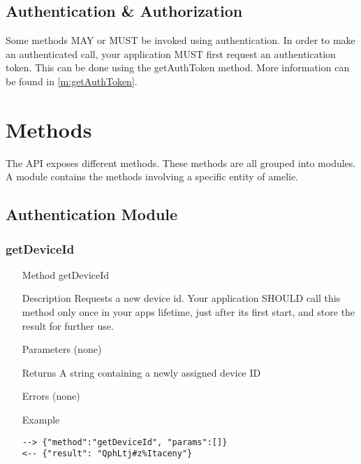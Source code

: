 \documentclass[a4paper]{scrreprt}
\begin{document}
\section{Authentication \& Authorization}
Some methods MAY or MUST be invoked using authentication. In order to make an authenticated call, your application MUST first request an authentication token. This can be done using the getAuthToken method. More information can be found in \autoref{m:getAuthToken}.


\chapter{Methods}
The API exposes different methods. These methods are all grouped into modules. A module contains the methods involving a specific entity of amelie. 

\section{Authentication Module}\label{sec:authmodule}
\subsection{getDeviceId}\label{m:getDeviceId}
\begin{enumerate}
\item[Method] getDeviceId
\item[Description] Requests a new device id. Your application SHOULD call this method only once in your apps lifetime, just after its first start, and store the result for further use.
\item[Parameters] (none)
\item[Returns] A string containing a newly assigned device ID
\item[Errors] (none)
\item[Example]
\begin{lstlisting}
--> {"method":"getDeviceId", "params":[]}
<-- {"result": "QphLtj#z%Itaceny"}
\end{lstlisting}
\end{enumerate}
\end{document}
